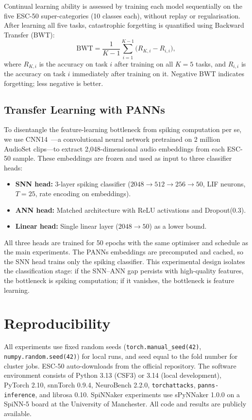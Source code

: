 Continual learning ability is assessed by training each model sequentially on the five ESC-50 super-categories (10 classes each), without replay or regularisation. After learning all five tasks, catastrophic forgetting is quantified using Backward Transfer (BWT):
\begin{equation}
\label{eq:bwt}
\text{BWT} = \frac{1}{K-1}\sum_{i=1}^{K-1}\bigl(R_{K,i} - R_{i,i}\bigr),
\end{equation}
where $R_{K,i}$ is the accuracy on task $i$ after training on all $K = 5$ tasks, and $R_{i,i}$ is the accuracy on task $i$ immediately after training on it. Negative BWT indicates forgetting; less negative is better.

\subsection{Transfer Learning with PANNs}
\label{ssec:panns}

To disentangle the feature-learning bottleneck from spiking computation per se, we use CNN14~\citep{kong2020panns}---a convolutional neural network pretrained on 2 million AudioSet clips---to extract 2,048-dimensional audio embeddings from each ESC-50 sample. These embeddings are frozen and used as input to three classifier heads:
\begin{itemize}[nosep]
    \item \textbf{SNN head:} 3-layer spiking classifier ($2048 \to 512 \to 256 \to 50$, LIF neurons, $T = 25$, rate encoding on embeddings).
    \item \textbf{ANN head:} Matched architecture with ReLU activations and Dropout(0.3).
    \item \textbf{Linear head:} Single linear layer ($2048 \to 50$) as a lower bound.
\end{itemize}

All three heads are trained for 50 epochs with the same optimiser and schedule as the main experiments. The PANNs embeddings are precomputed and cached, so the SNN head trains only the spiking classifier. This experimental design isolates the classification stage: if the SNN--ANN gap persists with high-quality features, the bottleneck is spiking computation; if it vanishes, the bottleneck is feature learning.

\section{Reproducibility}
\label{sec:reproducibility}

All experiments use fixed random seeds (\texttt{torch.manual\_seed(42)}, \texttt{numpy.random.seed(42)}) for local runs, and seed equal to the fold number for cluster jobs. ESC-50 auto-downloads from the official repository. The software environment consists of Python 3.13 (CSF3) or 3.14 (local development), PyTorch 2.10, snnTorch 0.9.4, NeuroBench 2.2.0, \texttt{torchattacks}, \texttt{panns-inference}, and librosa 0.10. SpiNNaker experiments use sPyNNaker 1.0.0 on a SpiNN-5 board at the University of Manchester. All code and results are publicly available.

